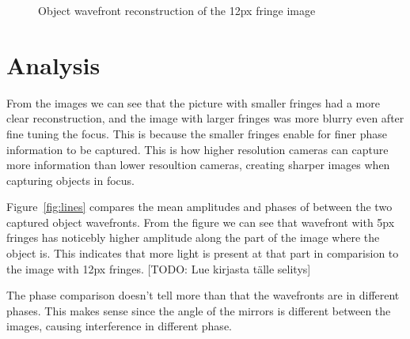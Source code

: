 \documentclass[12pt,a4paper,english
]{tunithesis}
\begin{document}
\begin{figure}
  \centering
  \caption{Object wavefront reconstruction of the 12px fringe image}
    \label{fig:12px}
\end{figure}

\section{Analysis}
From the images we can see that the picture with smaller fringes had a more clear reconstruction, and the image with larger fringes was more blurry even after fine tuning the focus. This is because the smaller fringes enable for finer phase information to be captured. This is how higher resolution cameras can capture more information than lower resoultion cameras, creating sharper images when capturing objects in focus.

Figure~\ref{fig:lines} compares the mean amplitudes and phases of between the two captured object wavefronts. From the figure we can see that wavefront with 5px fringes has noticebly higher amplitude along the part of the image where the object is. This indicates that more light is present at that part in comparision to the image with 12px fringes. [TODO: Lue kirjasta tälle selitys]

The phase comparison doesn't tell more than that the wavefronts are in different phases. This makes sense since the angle of the mirrors is different between the images, causing interference in different phase.
\end{document}
